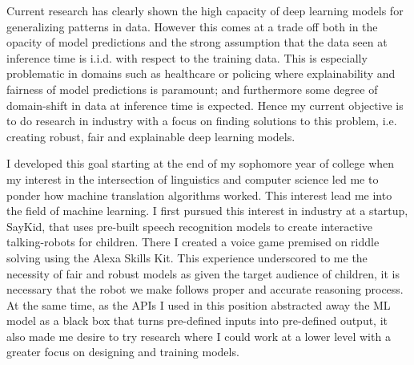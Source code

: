 \documentclass[12pt]{article}
\begin{document}

Current research has clearly shown the high capacity of deep learning models for generalizing patterns in data. However this comes at a trade off both in the opacity of model predictions and the strong assumption that the data seen at inference time is i.i.d. with respect to the training data. This is especially problematic in domains such as healthcare or policing where explainability and fairness of model predictions is paramount; and furthermore some degree of domain-shift in data at inference time is expected. Hence my current objective is to do research in industry with a focus on finding solutions to this problem, i.e. creating robust, fair and explainable deep learning models.


I developed this goal starting at the end of my sophomore year of college when my interest in the intersection of linguistics and computer science led me to ponder how machine translation algorithms worked. This interest lead me into the field of machine learning.
I first pursued this interest in industry at a startup, SayKid, that uses pre-built speech recognition models to create interactive talking-robots for children. There I created a voice game premised on riddle solving using the Alexa Skills Kit. This experience underscored to me the necessity of fair and robust models as given the target audience of children, it is necessary that the robot we make follows proper and accurate reasoning process. At the same time, as the APIs I used in this position abstracted away the ML model as a black box that turns pre-defined inputs into pre-defined output, it also made me desire to try research where I could work at a lower level with a greater focus on designing and training models. 
\end{document}
